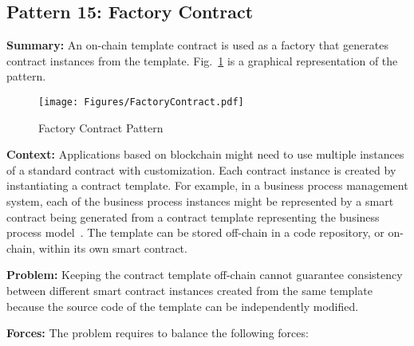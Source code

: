 
\subsection{ \textbf{Pattern 15: Factory Contract}}
\label{sec:factory}

\noindent \textbf{Summary:} An on-chain template contract is used as a factory that generates contract instances from the template. Fig.~\ref{fig:factory} is a graphical representation of the pattern.

\begin{figure}[t]
\begin{center}
\texttt{[image: Figures/FactoryContract.pdf]}
\caption{Factory Contract Pattern}\label{fig:factory}
\end{center}
\end{figure}

\vspace{0.5em}\noindent \textbf{Context:} 
Applications based on blockchain might need to use multiple instances of a standard contract with customization. Each contract instance is created by instantiating a contract template. For example, in a business process management system, each of the business process instances might be represented by a smart contract being generated from a contract template representing the business process model~\cite{Weber:BPM2016}. The template can be stored off-chain in a code repository, or on-chain, within its own smart contract.

\vspace{0.5em}\noindent \textbf{Problem:} 
Keeping the contract template off-chain cannot guarantee consistency between different smart contract instances created from the same template because the source code of the template can be independently modified. 

\vspace{0.5em}\noindent \textbf{Forces:} The problem requires to balance the following forces:

